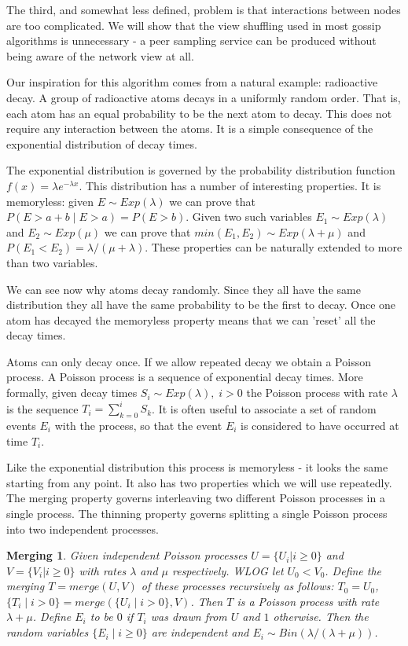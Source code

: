 \documentclass[a4paper,10pt]{article}
\begin{document}
The third, and somewhat less defined, problem is that interactions between nodes are too complicated. We will show that the view shuffling used in most gossip algorithms is unnecessary - a peer sampling service can be produced without being aware of the network view at all.

Our inspiration for this algorithm comes from a natural example: radioactive decay. A group of radioactive atoms decays in a uniformly random order. That is, each atom has an equal probability to be the next atom to decay. This does not require any interaction between the atoms. It is a simple consequence of the exponential distribution of decay times.

The exponential distribution is governed by the probability distribution function $ f(x)=\lambda e ^ { - \lambda x } $. This distribution has a number of interesting properties. It is memoryless: given $ E \sim Exp(\lambda) $ we can prove that $ P(E>a+b \;|\; E>a) = P(E>b) $. Given two such variables $ E_1 \sim Exp(\lambda) $ and $ E_2 \sim Exp(\mu) $ we can prove that $ min(E_1,E_2) \sim Exp(\lambda + \mu) $ and $ P(E_1 < E_2) = \lambda / (\mu + \lambda) $. These properties can be naturally extended to more than two variables. 

We can see now why atoms decay randomly. Since they all have the same distribution they all have the same probability to be the first to decay. Once one atom has decayed the memoryless property means that we can 'reset' all the decay times.

Atoms can only decay once. If we allow repeated decay we obtain a Poisson process. A Poisson process is a sequence of exponential decay times. More formally, given decay times $S_i \sim Exp(\lambda), \; i>0 $ the Poisson process with rate $ \lambda $ is the sequence $ T_i = \sum_{k=0}^i S_k $. It is often useful to associate a set of random events $E_i$ with the process, so that the event $E_i$ is considered to have occurred at time $T_i$. 

Like the exponential distribution this process is memoryless - it looks the same starting from any point. It also has two properties which we will use repeatedly. The merging property governs interleaving two different Poisson processes in a single process. The thinning property governs splitting a single Poisson process into two independent processes.

\newtheorem*{merging}{Merging}
\begin{merging}
Given independent Poisson processes $U=\{U_i | i \geq 0\}$ and $V=\{V_i | i \geq 0\}$ with rates $\lambda$ and $\mu$ respectively. WLOG let $U_0 < V_0$. Define the merging \;$T = merge(U,V)$\; of these processes recursively as follows: $T_0 = U_0$, $\{T_i \;|\; i>0\} = merge(\{U_i \;|\; i>0\}, V)$. Then $T$ is a Poisson process with rate $\lambda + \mu$. Define $E_i$ to be $0$ if $T_i$ was drawn from $U$ and $1$ otherwise. Then the random variables $\{E_i \;|\; i \geq 0\}$ are independent and $E_i \sim Bin(\lambda / (\lambda + \mu))$. 
\end{merging}
 
\end{document}
